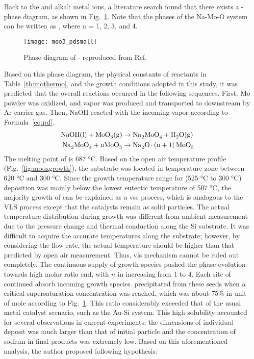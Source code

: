 Back to the  and alkali metal ions, a literature search found that there exists a - phase diagram, as shown in Fig.~\ref{fig:ch4pd}.\cite{Hoermann1929} Note that the phases of the Na-Mo-O system can be written as , where n = 1, 2, 3, and 4. 
\begin{figure}[htb]
\centering
\texttt{[image: moo3\_pdsmall]}
\caption[Phase diagram of  and ]{Phase diagram of - reproduced from Ref.~\cite{Hoermann1929}}
\label{fig:ch4pd}
\end{figure}
Based on this phase diagram, the physical constants of reactants in Table~\ref{tb:mothermo}, and the growth conditions adopted in this study, it was predicted that the overall reactions occurred in the following sequences. First, Mo powder was oxidized, and  vapor was produced and transported to downstream by Ar carrier gas. Then, NaOH reacted with the incoming  vapor according to Formula~\ref{eq:pd}. 
\begin{subequations}\label{eq:pd}
\begin{align}
\cee{NaOH(l) + MoO3(g) &\rightarrow Na2MoO4 + H2O(g)\\
Na2MoO4 + nMoO3   &\rightarrow Na2O.(n + 1)MoO3}
\end{align}
\end{subequations}
The melting point of  is 687 \si{\degreeCelsius}. Based on the open air temperature profile (Fig.~\ref{fig:mooxgrowth}), the substrate was located in temperature zone between 620 \si{\degreeCelsius} and 300 \si{\degreeCelsius}. Since the growth temperature range for  (525 \si{\degreeCelsius} to 300 \si{\degreeCelsius}) deposition was mainly below the lowest eutectic temperature of 507  \si{\degreeCelsius}, the majority growth of  can be explained as a \gls{vss} process, which is analogous to the VLS process except that the catalysts remain as solid particles. The actual temperature distribution during growth was different from ambient measurement due to the pressure change and thermal conduction along the Si substrate. It was difficult to acquire the accurate temperatures along the substrate; however, by considering the flow rate, the actual temperature should be higher than that predicted by open air measurement.\cite{Subannajui2010} Thus, \gls{vls} mechanism cannot be ruled out completely. The continuous supply of  growth species pushed the phase evolution towards high  molar ratio end, with $n$ in  increasing from 1 to 4. Each site of  continued absorb incoming  growth species.  precipitated from these seeds when a critical supersaturation concentration was reached, which was about 75\% in unit of mole according to Fig.~\ref{fig:ch4pd}. This ratio considerably exceeded that of the usual metal catalyst scenario, such as the Au-Si system. This high solubility accounted for several observations in current experiments: the dimensions of individual deposit was much larger than that of initial particle and the concentration of sodium in final products was extremely low. Based on this aforementioned analysis, the author proposed following hypothesis:

